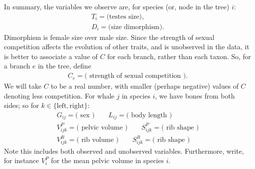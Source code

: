 \documentclass{article}
\begin{document}
In summary, the variables we observe are, for species (or, node in the tree) $i$:
\begin{gather*}
    T_i = \text{(testes size)}, \\
    D_i = \text{(size dimorphism)} .
\end{gather*}
Dimorphism is female size over male size.
Since the strength of sexual competition affects the evolution of other traits,
and is unobserved in the data,
it is better to associate a value of $C$ for each branch, rather than each taxon.
So, for a branch $e$ in the tree, define
\begin{gather*}
    C_{e} = \text{( strength of sexual competition )}  .
\end{gather*}
We will take $C$ to be a real number, with smaller (perhaps negative) values of $C$ denoting less competition.
For whale $j$ in species $i$, we have bones from both sides; so for $k \in \{\text{left},\text{right}\}$:
\begin{gather*}
    G_{ij} = \text{( sex )} \qquad  L_{ij} = \text{( body length )} \\
    V^P_{ijk} = \text{( pelvic volume )} \qquad S^P_{ijk} = \text{( rib shape )} \\
    V^R_{ijk} = \text{( rib volume )} \qquad S^R_{ijk} = \text{( rib shape )} 
\end{gather*}
Note this includes both observed and unobserved variables.
Furthermore, write, for instance $V^P_i$ for the mean pelvic volume in species $i$.
\end{document}

